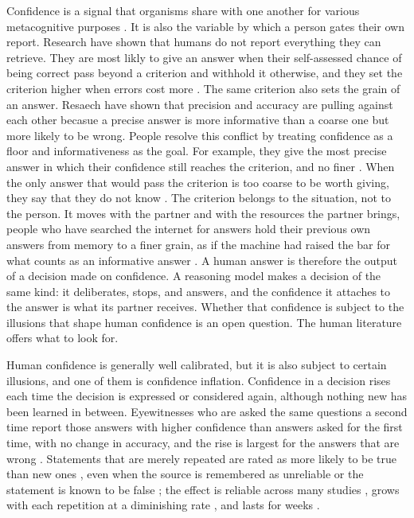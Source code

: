 \documentclass[11pt]{article}
\begin{document}
Confidence is a signal that organisms share with one another for various metacognitive purposes \citep{shea2014supra}. It is also the variable by which a person gates their own report. Research have shown that humans do not report everything they can retrieve. They are most likly to give an answer when their self-assessed chance of being correct pass beyond a criterion and withhold it otherwise, and they set the criterion higher when errors cost more \citep{koriat1996monitoring}. The same criterion also sets the grain of an answer. Resaech have shown that precision and accuracy are pulling against each other \citep{yaniv1995graininess} becasue a precise answer is more informative than a coarse one but more likely to be wrong. People resolve this conflict by treating confidence as a floor and informativeness as the goal. For example, they give the most precise answer in which their confidence still reaches the criterion, and no finer \citep{goldsmith2002strategic}. When the only answer that would pass the criterion is too coarse to be worth giving, they say that they do not know \citep{ackerman2008control}. The criterion belongs to the situation, not to the person. It moves with the partner and with the resources the partner brings, people who have searched the internet for answers hold their previous own answers from memory to a finer grain, as if the machine had raised the bar for what counts as an informative answer \citep{hamilton2023internet}. A human answer is therefore the output of a decision made on confidence. A reasoning model makes a decision of the same kind: it deliberates, stops, and answers, and the confidence it attaches to the answer is what its partner receives. Whether that confidence is subject to the illusions that shape human confidence is an open question. The human literature offers what to look for.

Human confidence is generally well calibrated, but it is also subject to certain illusions, and one of them is confidence inflation. Confidence in a decision rises each time the decision is expressed or considered again, although nothing new has been learned in between. Eyewitnesses who are asked the same questions a second time report those answers with higher confidence than answers asked for the first time, with no change in accuracy, and the rise is largest for the answers that are wrong \citep{shaw1996increases,shaw1996repeated,odinot2009repeated}. Statements that are merely repeated are rated as more likely to be true than new ones \citep{hasher1977frequency}, even when the source is remembered as unreliable \citep{begg1992dissociation} or the statement is known to be false \citep{fazio2015knowledge}; the effect is reliable across many studies \citep{dechene2010truth}, grows with each repetition at a diminishing rate \citep{hassan2021effects}, and lasts for weeks \citep{henderson2021trajectory}.
\end{document}
